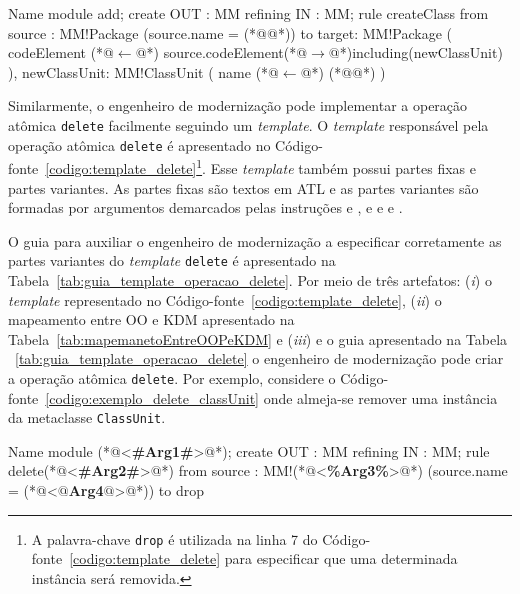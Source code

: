 \begin{codigo}[caption={[ATL para realizar a operação atômica \texttt{add} \texttt{ClassUnit}.] ATL para realizar a operação atômica \texttt{add} \texttt{ClassUnit}.},escapeinside={(*@}{@*)}, basicstyle=\footnotesize, label={codigo:exemplo_add_classUnit}, language=ATL]{Name}
module add;
create OUT : MM refining IN : MM;
rule createClass{
	from
		source : MM!Package (source.name = (*@@*))
	to 
		target: MM!Package (
			codeElement (*@$\leftarrow$@*) source.codeElement(*@$\rightarrow$@*)including(newClassUnit)
		),
		newClassUnit: MM!ClassUnit (
			name (*@$\leftarrow$@*) (*@@*)
		)
}
\end{codigo}


Similarmente, o engenheiro de modernização pode implementar a operação atômica \texttt{delete} facilmente seguindo um \textit{template}. O \textit{template} responsável pela operação atômica \texttt{delete} é apresentado no Código-fonte~\ref{codigo:template_delete}\footnote{A palavra-chave \texttt{drop} é utilizada na linha 7 do Código-fonte~\ref{codigo:template_delete} para especificar que uma determinada instância será removida.}. Esse \textit{template} também possui partes fixas e partes variantes. As partes fixas são textos em ATL e as partes variantes são formadas por argumentos demarcados pelas instruções \aspas{\textbf{<\#}} e \aspas{\textbf{\#>}}, \aspas{\textbf{<\%}} e \aspas{\textbf{\%>}} e  e . 


O guia para auxiliar o engenheiro de modernização a especificar corretamente as partes variantes do \textit{template} \texttt{delete} é apresentado na Tabela~\ref{tab:guia_template_operacao_delete}. Por meio de três artefatos: (\textit{i}) o \textit{template} representado no Código-fonte~\ref{codigo:template_delete}, (\textit{ii}) o mapeamento entre OO e KDM apresentado na Tabela~\ref{tab:mapemanetoEntreOOPeKDM} e (\textit{iii}) e o guia apresentado na Tabela ~\ref{tab:guia_template_operacao_delete} o engenheiro de modernização pode criar a operação atômica \texttt{delete}. Por exemplo, considere o Código-fonte~\ref{codigo:exemplo_delete_classUnit} onde almeja-se remover uma instância da metaclasse \texttt{ClassUnit}. 

\begin{codigo}[caption={[\textit{Template} ATL para realizar a operação atômica \texttt{delete}.] \textit{Template} ATL para realizar a operação atômica \texttt{delete}.},escapeinside={(*@}{@*)}, basicstyle=\footnotesize, label={codigo:template_delete}, language=ATL]{Name}
module (*@<\textbf{\#Arg1\#}>@*);
create OUT : MM refining IN : MM;
rule delete(*@<\textbf{\#Arg2\#}>@*) {
  from
      source : MM!(*@<\textbf{\%Arg3\%}>@*) (source.name = (*@<\textbf{$@$Arg4$@$}>@*))
  to
      drop
}
\end{codigo}

